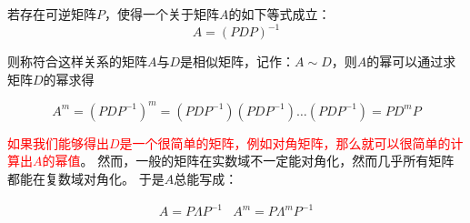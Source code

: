 若存在可逆矩阵$P$，使得一个关于矩阵$A$的如下等式成立：
$$A = (PDP)^{-1}$$

则称符合这样关系的矩阵$A$与$D$是相似矩阵，记作：$A \sim D$，则$A$的幂可以通过求矩阵$D$的幂求得

$$A^{m} = (PDP^{-1})^{m} = (PDP^{-1})(PDP^{-1})\dots(PDP^{-1})=PD^{m}P$$

\textcolor{red}{如果我们能够得出$D$是一个很简单的矩阵，例如对角矩阵，那么就可以很简单的计算出$A$的幂值}。
然而，一般的矩阵在实数域不一定能对角化，然而几乎所有矩阵都能在复数域对角化\cite{lru-kexue}。
于是$A$总能写成：

\begin{align*}
A=P\Lambda P^{-1} & A^{m} = P\Lambda^{m} P^{-1}
\end{align*}